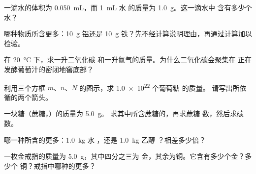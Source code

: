 \begin{exercise}[$\star\star$]\label{exo:g10:the-mole:6}
一滴水的体积为 \qty{0.050}{mL}，而 \qty{1}{mL} 水
的质量为 \qty{1.0}{g}。这一滴水中
含有多少个水？
\end{exercise}

\begin{exercise}[$\star\star$]\label{exo:g10:the-mole:7}
哪种物质所含更多：\qty{10}{g} 铝还是 \qty{10}{g}
铁？先不经计算说明理由，再通过计算加以检验。
\end{exercise}

\begin{exercise}[$\star\star$]\label{exo:g10:the-mole:8}
在 \qty{20}{\celsius} 下，求一升二氧化碳
和一升氮气的质量。为什么二氧化碳会聚集在
正在发酵葡萄汁的密闭地窖底部？
\end{exercise}

\begin{exercise}[$\star\star$]\label{exo:g10:the-mole:9}
利用三个方框 $m$、$n$、$N$ 的图示，求
\num{1.0e22} 个葡萄糖  的质量。
请写出所依循的两个箭头。
\end{exercise}

\begin{exercise}[$\star\star$]\label{exo:g10:the-mole:10}
一块糖（蔗糖，）的质量为 \qty{5.0}{g}。
求其中所含蔗糖的，再求蔗糖
数，然后求碳数。
\end{exercise}

\begin{exercise}[$\star\star$]\label{exo:g10:the-mole:11}
哪一种所含的更多：\qty{1.0}{kg} 水
，还是 \qty{1.0}{kg} 乙醇 ？相差多少倍？
\end{exercise}

\begin{exercise}[$\star\star\star$]\label{exo:g10:the-mole:12}
一枚金戒指的质量为 \qty{5.0}{g}，其中四分之三为
金，其余为铜。它含有多少个金？多少个
铜？戒指中哪种的更多？
\end{exercise}

